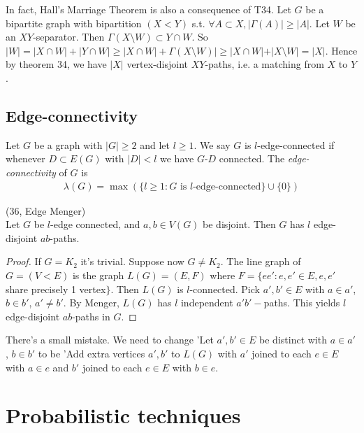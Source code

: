 \documentclass[a4paper]{article}
\begin{document}
In fact, Hall's Marriage Theorem is also a consequence of T34. Let $G$ be a bipartite graph with bipartition $(X<Y)$ s.t. $\forall A \subset X, |\Gamma(A)| \geq |A|$. Let $W$ be an $XY$-separator. Then $\Gamma(X \setminus W) \subset Y \cap W$. So $|W| = |X \cap W| + |Y \cap W| \geq |X \cap W| + \Gamma(X \setminus W)| \geq |X \cap W| + |X \setminus W| = |X|$. Hence by theorem 34, we have $|X|$ vertex-disjoint $XY$-paths, i.e. a matching from $X$ to $Y$.

\subsection{Edge-connectivity}
\begin{defi}
Let $G$ be a graph with $|G| \geq 2$ and let $l \geq 1$. We say $G$ is $l$-edge-connected if whenever $D \subset E(G)$ with $|D| < l$ we have $G$-$D$ connected. The \emph{edge-connectivity} of $G$ is 
\begin{equation*}
\begin{aligned}
\lambda(G) = \max ( \{l \geq 1: G \text{ is } l \text{-edge-connected}\} \cup \{0\} )
\end{aligned}
\end{equation*}
\end{defi}

\begin{coro} (36, Edge Menger)\\
Let $G$ be $l$-edge connected, and $a,b \in V(G)$ be disjoint. Then $G$ has $l$ edge-disjoint $ab$-paths.
\begin{proof}
If $G=K_2$ it's trivial. Suppose now $G \neq K_2$. The line graph of $G = (V<E)$ is the graph $L(G) = (E,F)$ where $F = \{ee': e,e' \in E, e,e' $ share precisely 1 vertex$\}$. Then $L(G)$ is $l$-connected. Pick $a',b' \in E$ with $a\in a'$, $b\in b'$, $a' \neq b'$. By Menger, $L(G)$ has $l$ independent $a'b'-$paths. This yields $l$ edge-disjoint $ab$-paths in $G$.
\end{proof}
\end{coro}

There's a small mistake. We need to change 'Let $a',b' \in E$ be distinct with $a \in a'$, $b \in b'$ to be 'Add extra vertices $a',b'$ to $L(G)$ with $a'$ joined to each $e \in E$ with $a \in e$ and $b'$ joined to each $e \in E$ with $b \in e$.

\newpage

\section{Probabilistic techniques}
\end{document}
